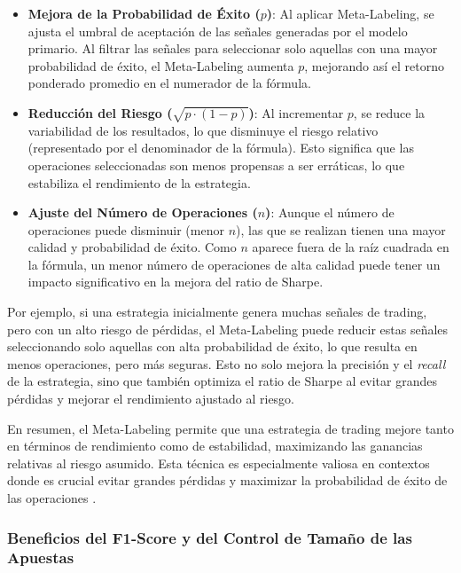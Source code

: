 \documentclass[a4paper,12pt, twoside]{report}
\begin{document}
\begin{itemize}
    \item \textbf{Mejora de la Probabilidad de Éxito ($p$)}: Al aplicar Meta-Labeling, 
    se ajusta el umbral de aceptación de las señales generadas por el modelo primario. 
    Al filtrar las señales para seleccionar solo aquellas con una mayor probabilidad 
    de éxito, el Meta-Labeling aumenta $p$, mejorando así el retorno ponderado promedio en el 
    numerador de la fórmula.
    
    \item \textbf{Reducción del Riesgo (\(\sqrt{p \cdot (1 - p)}\))}: Al incrementar \(p\), 
    se reduce la variabilidad de los resultados, lo que disminuye el riesgo relativo (representado 
    por el denominador de la fórmula). Esto significa que las operaciones seleccionadas son menos 
    propensas a ser erráticas, lo que estabiliza el rendimiento de la estrategia.
    
    \item \textbf{Ajuste del Número de Operaciones ($n$)}: Aunque el número de operaciones puede 
    disminuir (menor $n$), las que se realizan tienen una mayor calidad y probabilidad de éxito. 
    Como \(n\) aparece fuera de la raíz cuadrada en la fórmula, un menor número de operaciones de 
    alta calidad puede tener un impacto significativo en la mejora del ratio de Sharpe.
\end{itemize}


Por ejemplo, si una estrategia inicialmente genera muchas señales de trading, 
pero con un alto riesgo de pérdidas, el Meta-Labeling puede reducir estas señales 
seleccionando solo aquellas con alta probabilidad de éxito, lo que resulta en menos 
operaciones, pero más seguras. Esto no solo mejora la precisión y el \textit{recall} 
de la estrategia, sino que también optimiza el ratio de Sharpe al evitar grandes 
pérdidas y mejorar el rendimiento ajustado al riesgo.

En resumen, el Meta-Labeling permite que una estrategia de trading mejore tanto en 
términos de rendimiento como de estabilidad, maximizando las ganancias relativas al 
riesgo asumido. Esta técnica es especialmente valiosa en contextos donde es crucial 
evitar grandes pérdidas y maximizar la probabilidad de éxito de las 
operaciones \cite{lopezdeprado2018afml}.


\subsubsection{Beneficios del F1-Score y del Control de Tamaño de las Apuestas}
\end{document}
